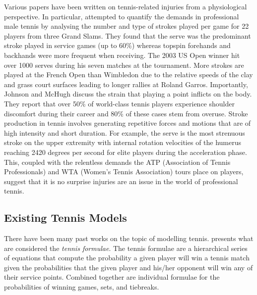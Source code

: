 \documentclass[letterpaper,12pt]{article}
\begin{document}
Various papers have been written on tennis-related injuries from a physiological perspective.  In particular, \cite{demands} attempted to quantify the demands in professional male tennis by analysing the number and type of strokes played per game for 22 players from three Grand Slams.  They found that the serve was the predominant stroke played in service games (up to 60\%) whereas topspin forehands and backhands were more frequent when receiving.  The 2003 US Open winner hit over 1000 serves during his seven matches at the tournament.  More strokes are played at the French Open than Wimbledon due to the relative speeds of the clay and grass court surfaces leading to longer rallies at Roland Garros.  Importantly, Johnson and McHugh discuss the strain that playing a point inflicts on the body.  They report that over 50\% of world-class tennis players experience shoulder discomfort during their career and 80\% of these cases stem from overuse.  Stroke production in tennis involves generating repetitive forces and motions that are of high intensity and short duration.  For example, the serve is the most strenuous stroke on the upper extremity with internal rotation velocities of the humerus reaching 2420 degrees per second for elite players during the acceleration phase.  This, coupled with the relentless demands the ATP (Association of Tennis Professionals) and WTA (Women's Tennis Association) tours place on players, suggest that it is no surprise injuries are an issue in the world of professional tennis.

\subsection{Existing Tennis Models}

There have been many past works on the topic of modelling tennis.  \cite{omalley} presents what are considered the \textit{tennis formulae}.  The tennis formulae are a hierarchical series of equations that compute the probability a given player will win a tennis match given the probabilities that the given player and his/her opponent will win any of their service points.  Combined together are individual formulae for the probabilities of winning games, sets, and tiebreaks.
\end{document}

